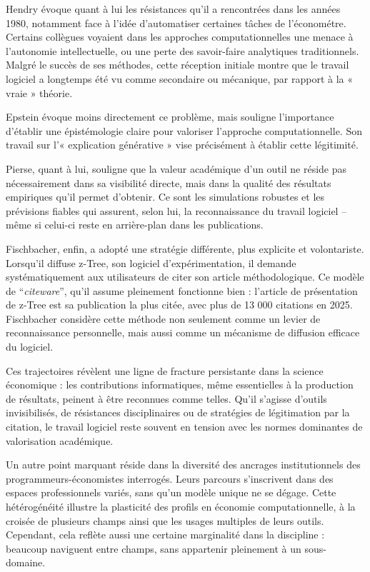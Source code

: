 Hendry évoque quant à lui les résistances qu’il a rencontrées dans les années 1980, notamment face à l’idée d’automatiser certaines tâches de l’économétre. Certains collègues voyaient dans les approches computationnelles une menace à l’autonomie intellectuelle, ou une perte des savoir-faire analytiques traditionnels. Malgré le succès de ses méthodes, cette réception initiale montre que le travail logiciel a longtemps été vu comme secondaire ou mécanique, par rapport à la « vraie » théorie. 

Epstein évoque moins directement ce problème, mais souligne l'importance d'établir une épistémologie claire pour valoriser l'approche computationnelle. Son travail sur l’« explication générative » vise précisément à établir cette légitimité. 

Pierse, quant à lui, souligne que la valeur académique d’un outil ne réside pas nécessairement dans sa visibilité directe, mais dans la qualité des résultats empiriques qu’il permet d’obtenir. Ce sont les simulations robustes et les prévisions fiables qui assurent, selon lui, la reconnaissance du travail logiciel – même si celui-ci reste en arrière-plan dans les publications. 

Fischbacher, enfin, a adopté une stratégie différente, plus explicite et volontariste. Lorsqu’il diffuse z-Tree, son logiciel d’expérimentation, il demande systématiquement aux utilisateurs de citer son article méthodologique. Ce modèle de “\textit{\textit{\textit{\textit{citeware}}}}”, qu’il assume pleinement fonctionne bien : l’article de présentation de z-Tree est sa publication la plus citée, avec plus de 13 000 citations en 2025. Fischbacher considère cette méthode non seulement comme un levier de reconnaissance personnelle, mais aussi comme un mécanisme de diffusion efficace du logiciel. 

Ces trajectoires révèlent une ligne de fracture persistante dans la science économique : les contributions informatiques, même essentielles à la production de résultats, peinent à être reconnues comme telles. Qu’il s’agisse d’outils invisibilisés, de résistances disciplinaires ou de stratégies de légitimation par la citation, le travail logiciel reste souvent en tension avec les normes dominantes de valorisation académique.



Un autre point marquant réside dans la diversité des ancrages institutionnels des programmeurs-économistes interrogés. Leurs parcours s’inscrivent dans des espaces professionnels variés, sans qu’un modèle unique ne se dégage. Cette hétérogénéité illustre la plasticité des profils en économie computationnelle, à la croisée de plusieurs champs ainsi que les usages multiples de leurs outils. Cependant, cela reflète aussi une certaine marginalité dans la discipline : beaucoup naviguent entre champs, sans appartenir pleinement à un sous-domaine. 

